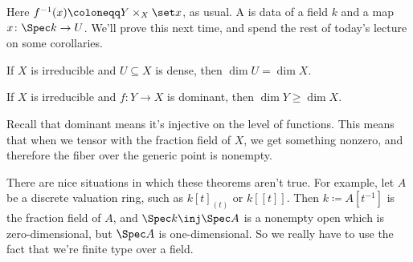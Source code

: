 Here $f^{-1}(x)\coloneqq Y\times_X\set x$, as usual. A  is data of a field $k$ and a map
$x\colon \Spec k\to U$. We'll prove this next time, and spend the rest of today's lecture on some corollaries.
\begin{cor}
If $X$ is irreducible and $U\subseteq X$ is dense, then $\dim U = \dim X$.
\end{cor}
\begin{cor}
If $X$ is irreducible and $f\colon Y\to X$ is dominant, then $\dim Y\ge\dim X$.
\end{cor}
Recall that dominant means it's injective on the level of functions. This means that when we tensor with the
fraction field of $X$, we get something nonzero, and therefore the fiber over the generic point is nonempty.

There are nice situations in which these theorems aren't true. For example, let $A$ be a discrete valuation ring,
such as $k[t]_{(t)}$ or $k[[t]]$. Then $k\coloneqq A[t^{-1}]$ is the fraction field of $A$, and $\Spec k\inj \Spec
A$ is a nonempty open which is zero-dimensional, but $\Spec A$ is one-dimensional. So we really have to use the
fact that we're finite type over a field.
